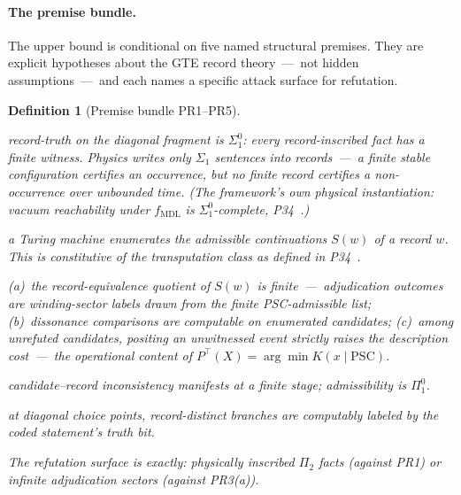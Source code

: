 \documentclass[11pt]{article}
\newtheorem{definition}[theorem]{Definition}
\theoremstyle{remark}
\newcommand{\fmdl}{\ensuremath{f_{\mathrm{MDL}}}}
\newcommand{\Ptop}{\ensuremath{P^{\top}}}
\begin{document}
\paragraph{The premise bundle.}
The upper bound is conditional on five named structural premises. They are
explicit hypotheses about the GTE record theory~---~not hidden
assumptions~---~and each names a specific attack surface for refutation.

\begin{definition}[Premise bundle PR1--PR5]
\label{def:premise_bundle}
\begin{description}[leftmargin=2.2em,itemsep=2pt]
  \item[PR1 (Finite-witness record truth):] record-truth on the diagonal
    fragment is $\Sigma^0_1$: every record-inscribed fact has a finite
    witness. Physics writes only $\Sigma_1$ sentences into records~---~a
    finite stable configuration certifies an occurrence, but no finite
    record certifies a non-occurrence over unbounded time. (The
    framework's own physical instantiation: vacuum reachability under
    \fmdl{} is $\Sigma^0_1$-complete, P34~\cite{SpivackGTEMobius}.)
  \item[PR2 (Effective candidate enumeration):] a Turing machine
    enumerates the admissible continuations $S(w)$ of a record $w$.
    This is constitutive of the transputation class as defined in
    P34~\cite{SpivackGTEMobius}.
  \item[PR3 (Finite sector structure with MDL-conservativity):]
    (a)~the record-equivalence quotient of $S(w)$ is finite~---~adjudication
    outcomes are winding-sector labels drawn from the finite PSC-admissible
    list; (b)~dissonance comparisons are computable on enumerated
    candidates; (c)~among unrefuted candidates, positing an unwitnessed
    event strictly raises the description cost~---~the operational content
    of $\Ptop(X) = \arg\min K(x \mid \text{PSC})$.
  \item[PR4 ($\Pi_1$ admissibility / $\Sigma_1$ refutation):]
    candidate--record inconsistency manifests at a finite stage;
    admissibility is $\Pi^0_1$.
  \item[PR5 (Record readout):] at diagonal choice points, record-distinct
    branches are computably labeled by the coded statement's truth bit.
\end{description}
The refutation surface is exactly: physically inscribed $\Pi_2$ facts
(against PR1) or infinite adjudication sectors (against PR3(a)).
\end{definition}
\end{document}
